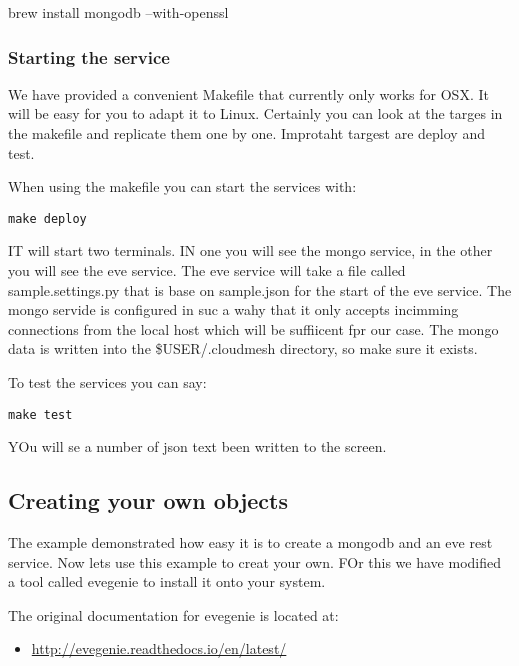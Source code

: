brew install mongodb --with-openssl

\subsubsection{Starting the service}\label{starting-the-service}

We have provided a convenient Makefile that currently only works for
OSX. It will be easy for you to adapt it to Linux. Certainly you can
look at the targes in the makefile and replicate them one by one.
Improtaht targest are deploy and test.

When using the makefile you can start the services with:

\begin{verbatim}
make deploy
\end{verbatim}

IT will start two terminals. IN one you will see the mongo service, in
the other you will see the eve service. The eve service will take a file
called sample.settings.py that is base on sample.json for the start of
the eve service. The mongo servide is configured in suc a wahy that it
only accepts incimming connections from the local host which will be
suffiicent fpr our case. The mongo data is written into the
\$USER/.cloudmesh directory, so make sure it exists.

To test the services you can say:

\begin{verbatim}
make test
\end{verbatim}

YOu will se a number of json text been written to the screen.

\subsection{Creating your own objects}\label{creating-your-own-objects}

The example demonstrated how easy it is to create a mongodb and an eve
rest service. Now lets use this example to creat your own. FOr this we
have modified a tool called evegenie to install it onto your system.

The original documentation for evegenie is located at:

\begin{itemize}
\tightlist
\item
  \url{http://evegenie.readthedocs.io/en/latest/}
\end{itemize}

